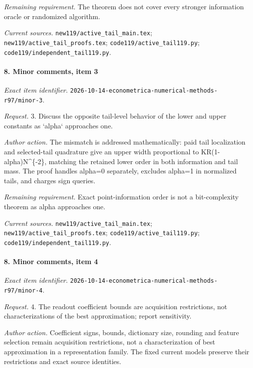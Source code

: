 \par\emph{Remaining requirement.} The theorem does not cover every stronger information oracle or randomized algorithm.

\par\emph{Current sources.} \nolinkurl{new119/active_tail_main.tex}; \nolinkurl{new119/active_tail_proofs.tex}; \nolinkurl{code119/active_tail119.py}; \nolinkurl{code119/independent_tail119.py}.

\paragraph{8. Minor comments, item 3}

\emph{Exact item identifier.} \nolinkurl{2026-10-14-econometrica-numerical-methods-r97/minor-3}.

\par\emph{Request.} 3. Discuss the opposite tail-level behavior of the lower and upper constants as `alpha` approaches one.

\par\emph{Author action.} The mismatch is addressed mathematically: paid tail localization and selected-tail quadrature give an upper width proportional to KR(1-alpha)N\textasciicircum{}\{-2\}, matching the retained lower order in both information and tail mass. The proof handles alpha=0 separately, excludes alpha=1 in normalized tails, and charges sign queries.

\par\emph{Remaining requirement.} Exact point-information order is not a bit-complexity theorem as alpha approaches one.

\par\emph{Current sources.} \nolinkurl{new119/active_tail_main.tex}; \nolinkurl{new119/active_tail_proofs.tex}; \nolinkurl{code119/active_tail119.py}; \nolinkurl{code119/independent_tail119.py}.

\paragraph{8. Minor comments, item 4}

\emph{Exact item identifier.} \nolinkurl{2026-10-14-econometrica-numerical-methods-r97/minor-4}.

\par\emph{Request.} 4. The readout coefficient bounds are acquisition restrictions, not characterizations of the best approximation; report sensitivity.

\par\emph{Author action.} Coefficient signs, bounds, dictionary size, rounding and feature selection remain acquisition restrictions, not a characterization of best approximation in a representation family. The fixed current models preserve their restrictions and exact source identities.

